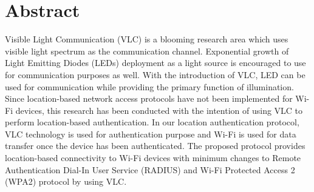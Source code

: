 \chapter{Abstract}
Visible Light Communication (VLC) is a blooming research area which uses visible light spectrum as the communication channel. Exponential growth of Light Emitting Diodes (LEDs) deployment as a light source is encouraged to use for communication purposes as well. With the introduction of VLC, LED can be used for communication while providing the primary function of illumination.  Since location-based network access protocols have not been implemented for Wi-Fi devices, this research has been conducted with the intention of using VLC to perform location-based authentication. In our location authentication protocol, VLC technology is used for authentication purpose and Wi-Fi is used for data transfer once the device has been authenticated.  The proposed protocol provides location-based connectivity to Wi-Fi devices with minimum changes to Remote Authentication Dial-In User Service (RADIUS) and Wi-Fi Protected Access 2 (WPA2) protocol by using VLC.